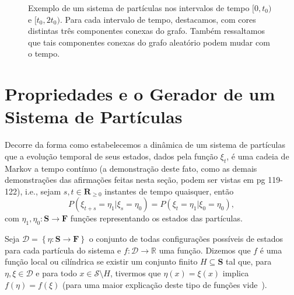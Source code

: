 \documentclass[twoside,openright,titlepage,numbers=noenddot,headinclude,  lineheaders footinclude=true,cleardoublepage=empty,
                                BCOR=5mm,paper=a4,fontsize=12pt ]{scrbook}
\theoremstyle{definition}
\begin{document}
\begin{figure}[t!]
\caption{Exemplo de um sistema de partículas nos intervalos de tempo
$[0, t_0)$ e $[t_0, 2t_0)$. Para cada intervalo de tempo, destacamos, 
com cores distintas três componentes conexas do grafo. Também ressaltamos
que tais componentes conexas do grafo aleatório podem mudar com o tempo.}
\label{fig:harry}
\end{figure}

\section{Propriedades e o Gerador de um Sistema de Part\'iculas}
Decorre da forma como estabelecemos a dinâmica de um sistema de partículas
que a evolução temporal  de seus estados, dados pela função
$\xi_t$, é uma cadeia de Markov a tempo contínuo
(a demonstração deste fato, como as demais demonstrações das
afirmações feitas  nesta 
seção, podem ser vistas em \cite{durret2} pg 119-122), i.e., sejam
$s,t \in \mathbf{R}_{\geq 0}$ instantes de tempo quaisquer, então
\[
P(\xi_{t+s} = \eta_1 |  \xi_{s} = \eta_0 ) =
P(\xi_{t} = \eta_1 |  \xi_{0} = \eta_0 ),
\]
com $\eta_1, \eta_0: \mathbf{S} \rightarrow 
\mathbf{F}$ funções representando os estados das partículas. 

Seja 
$\mathscr{D} = \left\{ \eta: \mathbf{S} \rightarrow \mathbf{F}
\right\}$ o conjunto de todas configurações possíveis de estados
para cada partícula do sistema e $f: \mathscr{D} \rightarrow \mathbb{R}$
uma função. Dizemos que $f$ é uma função local ou cilíndrica %
se existir um conjunto finito $H \subseteq \mathbf{S}$ tal que, para
$\eta, \xi \in \mathscr{D}$ e para todo $x \in 
\mathscr{S} \setminus H$, tivermos que $\eta(x) = \xi(x)$ implica
$f(\eta) = f(\xi)$ (para uma maior explicação deste tipo de funções
vide~\cite{daniela}).
\end{document}
